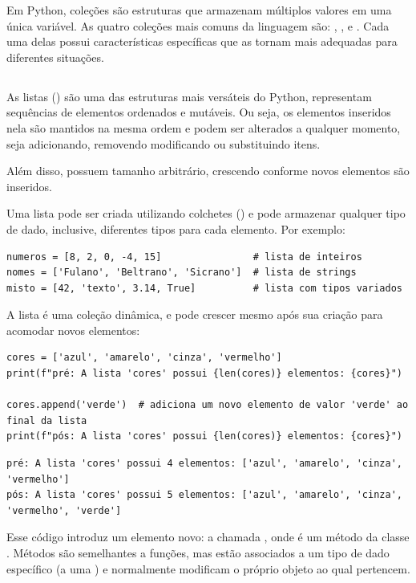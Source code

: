 Em Python, coleções são estruturas que armazenam múltiplos valores em uma única variável.
As quatro coleções mais comuns da linguagem são: , ,  e .
Cada uma delas possui características específicas que as tornam mais adequadas para diferentes situações.



\subsection{}
As listas () são uma das estruturas mais versáteis do Python, representam sequências de elementos
ordenados e mutáveis.
Ou seja, os elementos inseridos nela são mantidos na mesma ordem e podem ser alterados a qualquer momento,
seja adicionando, removendo modificando ou substituindo itens.

Além disso, possuem tamanho arbitrário, crescendo conforme novos elementos são inseridos.

Uma lista pode ser criada utilizando colchetes (\inlcode{[]}) e pode armazenar qualquer tipo de dado, inclusive, diferentes tipos para cada elemento.
Por exemplo:
\begin{verbatim}
numeros = [8, 2, 0, -4, 15]                # lista de inteiros
nomes = ['Fulano', 'Beltrano', 'Sicrano']  # lista de strings
misto = [42, 'texto', 3.14, True]          # lista com tipos variados
\end{verbatim}

A lista é uma coleção dinâmica, e pode crescer mesmo após sua criação para acomodar novos elementos:
\begin{verbatim}
cores = ['azul', 'amarelo', 'cinza', 'vermelho']
print(f"pré: A lista 'cores' possui {len(cores)} elementos: {cores}")

cores.append('verde')  # adiciona um novo elemento de valor 'verde' ao final da lista
print(f"pós: A lista 'cores' possui {len(cores)} elementos: {cores}")
\end{verbatim}
\begin{verbatim}
pré: A lista 'cores' possui 4 elementos: ['azul', 'amarelo', 'cinza', 'vermelho']
pós: A lista 'cores' possui 5 elementos: ['azul', 'amarelo', 'cinza', 'vermelho', 'verde']
\end{verbatim}

Esse código introduz um elemento novo: a chamada , onde  é um método da classe
.
Métodos são semelhantes a funções, mas estão associados a um tipo de dado específico (a uma ) e
normalmente modificam o próprio objeto ao qual pertencem.

